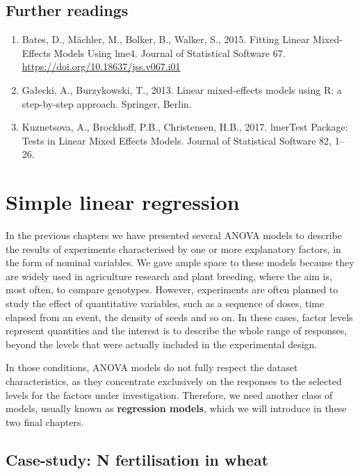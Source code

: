 \documentclass[a4paper,12pt,oneside]{book}
\providecommand{\tightlist}{%
  \setlength{\itemsep}{0pt}\setlength{\parskip}{0pt}}
\begin{document}
\hypertarget{further-readings-9}{%
\section{Further readings}\label{further-readings-9}}

\begin{enumerate}
\def\labelenumi{\arabic{enumi}.}
\tightlist
\item
  Bates, D., Mächler, M., Bolker, B., Walker, S., 2015. Fitting Linear Mixed-Effects Models Using lme4. Journal of Statistical Software 67. \url{https://doi.org/10.18637/jss.v067.i01}
\item
  Gałecki, A., Burzykowski, T., 2013. Linear mixed-effects models using R: a step-by-step approach. Springer, Berlin.
\item
  Kuznetsova, A., Brockhoff, P.B., Christensen, H.B., 2017. lmerTest Package: Tests in Linear Mixed Effects Models. Journal of Statistical Software 82, 1--26.
\end{enumerate}

\hypertarget{simple-linear-regression}{%
\chapter{Simple linear regression}\label{simple-linear-regression}}

In the previous chapters we have presented several ANOVA models to describe the results of experiments characterised by one or more explanatory factors, in the form of nominal variables. We gave ample space to these models because they are widely used in agriculture research and plant breeding, where the aim is, most often, to compare genotypes. However, experiments are often planned to study the effect of quantitative variables, such as a sequence of doses, time elapsed from an event, the density of seeds and so on. In these cases, factor levels represent quantities and the interest is to describe the whole range of responses, beyond the levels that were actually included in the experimental design.

In those conditions, ANOVA models do not fully respect the dataset characteristics, as they concentrate exclusively on the responses to the selected levels for the factors under investigation. Therefore, we need another class of models, usually known as \textbf{regression models}, which we will introduce in these two final chapters.

\hypertarget{case-study-n-fertilisation-in-wheat}{%
\section{Case-study: N fertilisation in wheat}\label{case-study-n-fertilisation-in-wheat}}
\end{document}

